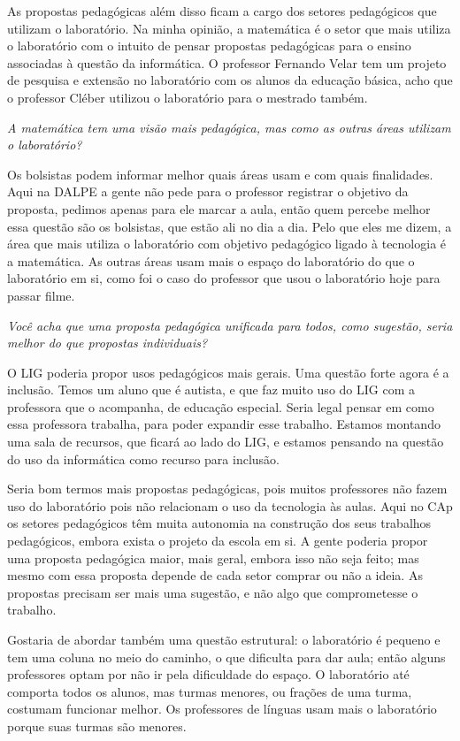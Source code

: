 As propostas pedagógicas além disso ficam a cargo dos setores pedagógicos que utilizam o laboratório. Na minha opinião, a matemática é o setor que mais utiliza o laboratório com o intuito de pensar propostas pedagógicas para o ensino associadas à questão da informática. O professor Fernando Velar tem um projeto de pesquisa e extensão no laboratório com os alunos da educação básica, acho que o professor Cléber utilizou o laboratório para o mestrado também.

\textit{A matemática tem uma visão mais pedagógica, mas como as outras áreas utilizam o laboratório?}

Os bolsistas podem informar melhor quais áreas usam e com quais finalidades. Aqui na DALPE a gente não pede para o professor registrar o objetivo da proposta, pedimos apenas para ele marcar a aula, então quem percebe melhor essa questão são os bolsistas, que estão ali no dia a dia. Pelo que eles me dizem, a área que mais utiliza o laboratório com objetivo pedagógico ligado à tecnologia é a matemática. As outras áreas usam mais o espaço do laboratório do que o laboratório em si, como foi o caso do professor que usou o laboratório hoje para passar filme.

\textit{Você acha que uma proposta pedagógica unificada para todos, como sugestão, seria melhor do que propostas individuais?}

O LIG poderia propor usos pedagógicos mais gerais. Uma questão forte agora é a inclusão. Temos um aluno que é autista, e que faz muito uso do LIG com a professora que o acompanha, de educação especial. Seria legal pensar em como essa professora trabalha, para poder expandir esse trabalho. Estamos montando uma sala de recursos, que ficará ao lado do LIG, e estamos pensando na questão do uso da informática como recurso para inclusão.

Seria bom termos mais propostas pedagógicas, pois muitos professores não fazem uso do laboratório pois não relacionam o uso da tecnologia às aulas. Aqui no CAp os setores pedagógicos têm muita autonomia na construção dos seus trabalhos pedagógicos, embora exista o projeto da escola em si. A gente poderia propor uma proposta pedagógica maior, mais geral, embora isso não seja feito; mas mesmo com essa proposta depende de cada setor comprar ou não a ideia. As propostas precisam ser mais uma sugestão, e não algo que comprometesse o trabalho.

Gostaria de abordar também uma questão estrutural: o laboratório é pequeno e tem uma coluna no meio do caminho, o que dificulta para dar aula; então alguns professores optam por não ir pela dificuldade do espaço. O laboratório até comporta todos os alunos, mas turmas menores, ou frações de uma turma, costumam funcionar melhor. Os professores de línguas usam mais o laboratório porque suas turmas são menores.

